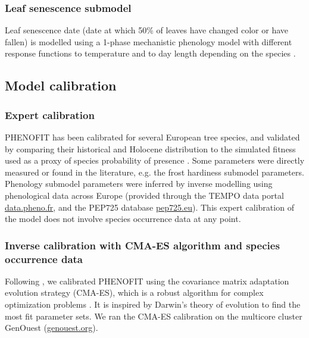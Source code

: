 \documentclass[letterpaper,8pt]{extarticle}  %
\begin{document}
\begin{doublespacing}
\begin{linenumbers}
\subsubsection{Leaf senescence submodel}
Leaf senescence date (date at which 50\% of leaves have changed color or have fallen) is modelled using a 1-phase mechanistic phenology model with different response functions to temperature and to day length depending on the species \citep{Delpierre2009}. 

\subsection{Model calibration}

\subsubsection{Expert calibration}

PHENOFIT has been calibrated for several European tree species, and validated  by comparing their historical and Holocene distribution to the simulated fitness used as a proxy of species probability of presence  \citep{Saltre2013, Duputie2015, Gauzere2020, VanderMeersch2024}. Some parameters were directly measured or found in the literature, e.g. the frost hardiness submodel parameters. Phenology submodel parameters were inferred by inverse modelling using phenological data across Europe (provided through the TEMPO data portal \url{data.pheno.fr}, and the PEP725 database \url{pep725.eu}). %
This expert calibration of the model does not involve species occurrence data at any point.

\subsubsection{Inverse calibration with CMA-ES algorithm and species occurrence data}

Following \citet{VanderMeersch2023}, we calibrated PHENOFIT using the covariance matrix adaptation evolution strategy (CMA-ES), which  is a robust algorithm for complex optimization problems \citep{Hansen2001}. It is inspired by Darwin's theory of evolution to find the most fit parameter sets. We ran the CMA-ES calibration on the multicore cluster GenOuest (\url{genouest.org}).


\end{linenumbers}
\end{doublespacing}
\end{document}
